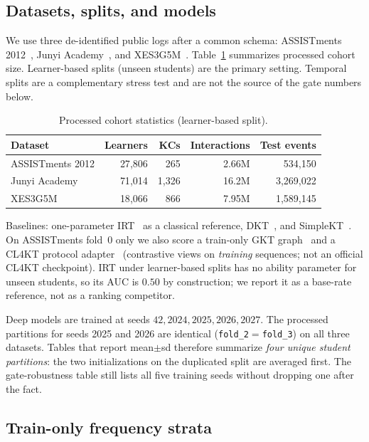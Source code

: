 \documentclass[journal,10pt,twocolumn]{IEEEtran}
\begin{document}
\subsection{Datasets, splits, and models}

We use three de-identified public logs after a common schema: ASSISTments 2012~\cite{assistments2012data,liu2022pykt}, Junyi Academy~\cite{junyi2019kaggle}, and XES3G5M~\cite{liu2023xes3g5m}. Table~\ref{tab:data} summarizes processed cohort size. Learner-based splits (unseen students) are the primary setting. Temporal splits are a complementary stress test and are not the source of the gate numbers below.

\begin{table}[!t]
\caption{Processed cohort statistics (learner-based split).}
\label{tab:data}
\centering
\footnotesize
\begin{tabular}{lrrrr}
\toprule
Dataset & Learners & KCs & Interactions & Test events \\
\midrule
ASSISTments 2012 & 27{,}806 & 265 & 2.66M & 534{,}150 \\
Junyi Academy & 71{,}014 & 1{,}326 & 16.2M & 3{,}269{,}022 \\
XES3G5M & 18{,}066 & 866 & 7.95M & 1{,}589{,}145 \\
\bottomrule
\end{tabular}
\end{table}

Baselines: one-parameter IRT~\cite{rasch1960probabilistic} as a classical reference, DKT~\cite{piech2015deep}, and SimpleKT~\cite{liu2023simplekt}. On ASSISTments fold~0 only we also score a train-only GKT graph~\cite{nakagawa2019graph} and a CL4KT protocol adapter~\cite{lee2022cl4kt} (contrastive views on \emph{training} sequences; not an official CL4KT checkpoint). IRT under learner-based splits has no ability parameter for unseen students, so its AUC is $0.50$ by construction; we report it as a base-rate reference, not as a ranking competitor.

Deep models are trained at seeds $42, 2024, 2025, 2026, 2027$. The processed partitions for seeds 2025 and 2026 are identical (\texttt{fold\_2}$=$\texttt{fold\_3}) on all three datasets. Tables that report mean$\pm$sd therefore summarize \emph{four unique student partitions}: the two initializations on the duplicated split are averaged first. The gate-robustness table still lists all five training seeds without dropping one after the fact.

\subsection{Train-only frequency strata}
\end{document}
